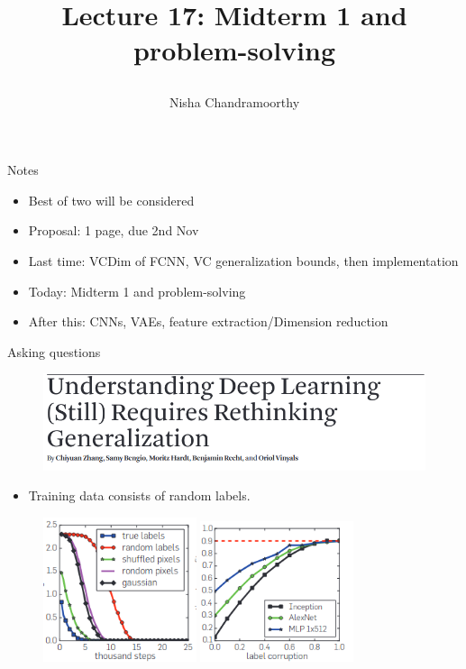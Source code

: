 \documentclass[final]{beamer}
\title{\begin{huge}{Lecture 17: Midterm 1 and problem-solving}\end{huge}} %
\author{Nisha Chandramoorthy} %
\begin{document}
\frame{\titlepage}

\begin{frame}{Notes}
\begin{itemize}
\item Best of two will be considered
\pause
\item Proposal: 1 page, due 2nd Nov
\pause
\item Last time: VCDim of FCNN, VC generalization bounds, then implementation  
\pause
\item Today: Midterm 1 and problem-solving
\pause
\item After this: CNNs, VAEs, feature extraction/Dimension reduction
\end{itemize}
\end{frame}
\begin{frame}{Asking questions}
\begin{figure}
\includegraphics[width=\textwidth]{paperTitle.png}
\end{figure}
\begin{itemize}
\item Training data consists of random labels.
\end{itemize}
\pause
	\begin{figure}
	\includegraphics[width=0.4\textwidth]{trainingError.png}
	\includegraphics[width=0.4\textwidth]{testError.png}
	\end{figure}
\end{frame}
\end{document}
